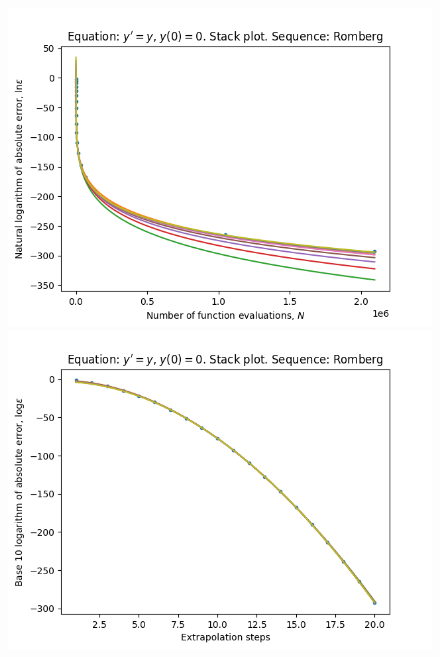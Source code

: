 \begin{figure}[H]
\centering
\begin{minipage}{0.45\textwidth}
\centering
\includegraphics[scale=0.45]{../results/emr_plots/exp_growth_hp_romberg_stack.png}
\end{minipage}
\begin{minipage}{0.45\textwidth}
\centering
\includegraphics[scale=0.45]{../results/emr_plots/exp_growth_hp_romberg_steps_stack.png}
\end{minipage}
\end{figure}

